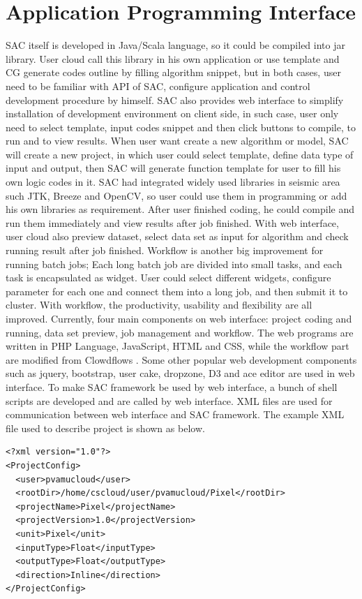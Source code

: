 \section{Application Programming Interface}
SAC itself is developed in Java/Scala language, so it could be compiled into jar library. User cloud call this library in his own application or use template and CG generate codes outline by filling algorithm snippet, but in both cases, user need to be familiar with API of SAC, configure application and control development procedure by himself. SAC also provides web interface to simplify installation of development environment on client side, in such case, user only need to select template, input codes snippet and then click buttons to compile, to run and to view results. 
When user want create a new algorithm or model, SAC will create a new project, in which user could select template, define data type of input and output, then SAC will generate function template for user to fill his own logic codes in it. SAC had integrated widely used libraries in seismic area such JTK, Breeze and OpenCV, so user could use them in programming or add his own libraries as requirement. After user finished coding, he could compile and run them immediately and view results after job finished. With web interface, user cloud also preview dataset, select data set as input for algorithm and check running result after job finished. Workflow is another big improvement for running batch jobs; Each long batch job are divided into small tasks, and each task is encapsulated as widget. User could select different widgets, configure parameter for each one and connect them into a long job, and then submit it to cluster. With workflow, the productivity, usability and flexibility are all improved. Currently, four main components on web interface: project coding and running, data set preview, job management and workflow. The web programs are written in PHP Language, JavaScript, HTML and CSS, while the workflow part are modified from Clowdflows \cite{ClowdflowsMain}. Some other popular web development components such as jquery, bootstrap, user cake, dropzone, D3 and ace editor are used in web interface. To make SAC framework be used by web interface, a bunch of shell scripts are developed and are called by web interface. XML files are used for communication between web interface and SAC framework. The example XML file used to describe project is shown as below. 

\lstset{language=XML,frame=single}
\begin{lstlisting}[float,caption=Sample XML file of Project Configuration,label=XMLProjectConfig]
<?xml version="1.0"?>
<ProjectConfig>
  <user>pvamucloud</user>
  <rootDir>/home/cscloud/user/pvamucloud/Pixel</rootDir>
  <projectName>Pixel</projectName>
  <projectVersion>1.0</projectVersion>
  <unit>Pixel</unit>
  <inputType>Float</inputType>
  <outputType>Float</outputType>
  <direction>Inline</direction>
</ProjectConfig>
\end{lstlisting}
